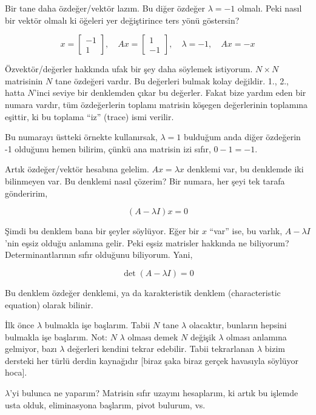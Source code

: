\documentclass[12pt,fleqn]{article}\usepackage{../../common}
\begin{document}
Bir tane daha özdeğer/vektör lazım. Bu diğer özdeğer $\lambda = -1$
olmalı. Peki nasıl bir vektör olmalı ki öğeleri yer değiştirince ters yönü
göstersin? 

$$ 
x = \left[\begin{array}{r} -1 \\ 
1 \end{array}\right],  \quad
Ax = \left[\begin{array}{r} 1 \\ 
-1 \end{array}\right],  \quad
\lambda = -1,  \quad
Ax = -x
$$

Özvektör/değerler hakkında ufak bir şey daha söylemek istiyorum. $N \times
N$ matrisinin $N$ tane özdeğeri vardır. Bu değerleri bulmak kolay
değildir. 1., 2., hatta $N$'inci seviye bir denklemden çıkar bu
değerler. Fakat bize yardım eden bir numara vardır, tüm özdeğerlerin
toplamı matrisin köşegen değerlerinin toplamına eşittir, ki bu toplama
``iz'' (trace) ismi verilir. 

Bu numarayı üstteki örnekte kullanırsak, $\lambda = 1$ bulduğum anda diğer
özdeğerin -1 olduğunu hemen bilirim, çünkü ana matrisin izi sıfır, 
$0 - 1 = -1$. 

Artık özdeğer/vektör hesabına gelelim. $Ax = \lambda x$ denklemi var, bu
denklemde iki bilinmeyen var. Bu denklemi nasıl çözerim? Bir numara, her
şeyi tek tarafa gönderirim,

$$ (A-\lambda I )x = 0 $$

Şimdi bu denklem bana bir şeyler söylüyor. Eğer bir $x$ ``var'' ise, bu
varlık, $A-\lambda I$'nin eşsiz olduğu anlamına gelir. Peki eşsiz matrisler
hakkında ne biliyorum? Determinantlarının sıfır olduğunu biliyorum. Yani,

$$ \det (A -\lambda I) = 0 $$

Bu denklem özdeğer denklemi, ya da karakteristik denklem (characteristic
equation) olarak bilinir. 

İlk önce $\lambda$ bulmakla işe başlarım. Tabii $N$ tane $\lambda$
olacaktır, bunların hepsini bulmakla işe başlarım. Not: $N$ $\lambda$
olması demek $N$ değişik $\lambda$ olması anlamına gelmiyor, bazı $\lambda$
değerleri kendini tekrar edebilir. Tabii tekrarlanan $\lambda$ bizim
dersteki her türlü derdin kaynağıdır [biraz şaka biraz gerçek havasıyla
söylüyor hoca].

$\lambda$'yi bulunca ne yaparım? Matrisin sıfır uzayını hesaplarım, ki artık bu
işlemde usta olduk, eliminasyona başlarım, pivot bulurum, vs.
\end{document}
